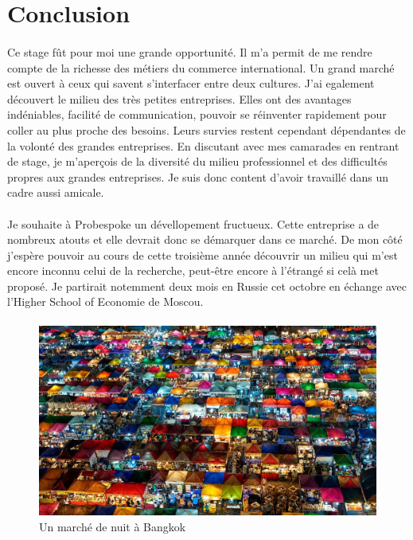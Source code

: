 \section*{Conclusion}
\paragraph{}
Ce stage fût pour moi une grande opportunité. Il m'a permit de me rendre compte de la richesse des métiers du commerce international. Un grand marché est ouvert à ceux qui savent s'interfacer entre deux cultures. J'ai egalement découvert le milieu des très petites entreprises. Elles ont des avantages indéniables, facilité de communication, pouvoir se réinventer rapidement pour coller au plus proche des besoins. Leurs survies restent cependant dépendantes de la volonté des grandes entreprises. En discutant avec mes camarades en rentrant de stage, je m'aperçois de la diversité du milieu professionnel et des difficultés propres aux grandes entreprises. Je suis donc content d'avoir travaillé dans un cadre aussi amicale.
 \paragraph{}
 Je souhaite à Probespoke un dévellopement fructueux. Cette entreprise a de nombreux atouts et elle devrait donc se démarquer dans ce marché. De mon côté j'espère pouvoir au cours de cette troisième année découvrir un milieu qui m'est encore inconnu celui de la recherche, peut-être encore à l'étrangé si celà met proposé. Je partirait notemment deux mois en Russie cet octobre en échange avec l'Higher School of Economie de Moscou.
 \paragraph{}
\begin{figure}[h]
\includegraphics[width=16cm]{image/marche.jpg}
\caption{Un marché de nuit à Bangkok}
\end{figure}
